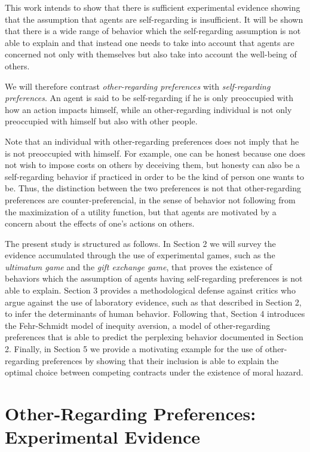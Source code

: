 \documentclass[12pt]{article}
\begin{document}
This work intends to show that there is sufficient experimental evidence showing that the assumption that agents are self-regarding is insufficient. It will be shown that there is a wide range of behavior which the self-regarding assumption is not able to explain and that instead one needs to take into account that agents are concerned not only with themselves but also take into account the well-being of others.

We will therefore contrast \textit{other-regarding preferences} with \textit{self-regarding preferences}. An agent is said to be self-regarding if he is only preoccupied with how an action impacts himself, while an other-regarding individual is not only preoccupied with himself but also with other people. 

Note that an individual with other-regarding preferences does not imply that he is not preoccupied with himself. For example, one can be honest because one does not wish to impose costs on others by deceiving them, but honesty can also be a self-regarding behavior if practiced in order to be the kind of person one wants to be. Thus, the distinction between the two preferences is not that other-regarding preferences are counter-preferencial, in the sense of behavior not following from the maximization of a utility function, but that agents are motivated by a concern about the effects of one's actions on others.

The present study is structured as follows. In Section 2 we will survey the evidence accumulated through the use of experimental games, such as the \textit{ultimatum game} and the \textit{gift exchange game}, that proves the existence of behaviors which the assumption of agents having self-regarding preferences is not able to explain. Section 3 provides a methodological defense against critics who argue against the use of laboratory evidence, such as that described in Section 2, to infer the determinants of human behavior. Following that, Section 4 introduces the Fehr-Schmidt model of inequity aversion, a model of other-regarding preferences that is able to predict the perplexing behavior documented in Section 2. Finally, in Section 5 we provide a motivating example for the use of other-regarding preferences by showing that their inclusion is able to explain the optimal choice between competing contracts under the existence of moral hazard.  




\section{Other-Regarding Preferences: Experimental Evidence}
\end{document}
